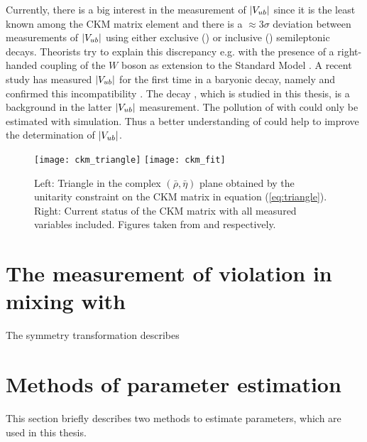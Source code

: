 Currently, there is a big interest in the measurement of $|{V_{{u}{b}}}|$ since it is the least known among the CKM matrix element and there is a $\approx 3\sigma$ deviation between measurements of $|{V_{{u}{b}}}|$ using either exclusive (\decay{\B}{\pi\ell\neul}) or inclusive () semileptonic decays.
Theorists try to explain this discrepancy e.g. with the presence of a right-handed coupling of the $W$ boson as extension to the Standard Model \cite{Vub_RightHanded}.
A recent \lhcb study has measured $|{V_{{u}{b}}}|$ for the first time in a baryonic decay, namely \decay{\Lb}{\proton\mun\neumb} and confirmed this incompatibility \cite{SL_Vub}.
The decay \LbToDpmunuX, which is studied in this thesis, is a background in the latter $|{V_{{u}{b}}}|$ measurement.
The pollution of \decay{\Lb}{\proton\mun\neumb} with \LbToDpmunuX could only be estimated with simulation.
Thus a better understanding of \LbToDpmunuX could help to improve the determination of $|{V_{{u}{b}}}|$.
\begin{figure}[ptb]
    \centering
	\texttt{[image: ckm\_triangle]}	
	\texttt{[image: ckm\_fit]}	
	\caption{Left: Triangle in the complex $(\bar{\rho}, \bar{\eta})$ plane obtained by the unitarity constraint on the CKM matrix in equation (\ref{eq:triangle}). Right: Current status of the CKM matrix with all measured variables included. Figures taken from \cite{PDG} and \cite{CKM_fitter}
    respectively.}
	\label{fig:CKM_triangle}
\end{figure}

\section{The measurement of \CP violation in mixing with \asld}
The symmetry transformation \CP describes

\section{Methods of parameter estimation}
This section briefly describes two methods to estimate parameters, which are used in this thesis.

